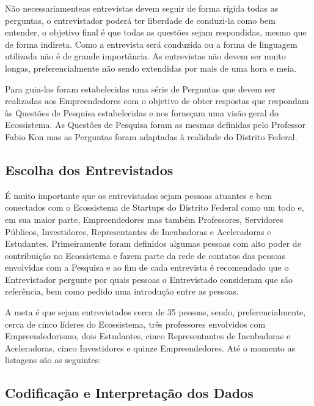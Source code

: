 Não necessariamenteas entrevistas devem seguir de forma rígida todas as perguntas, o entrevistador poderá ter liberdade de conduzi-la como bem entender, o objetivo final é que todas as questões sejam respondidas, mesmo que de forma indireta. Como a entrevista será conduzida ou a forma de linguagem utilizada não é de grande importância. As entrevistas não devem ser muito longas, preferencialmente não sendo extendidas por mais de uma hora e meia.

Para guia-las foram estabelecidas uma série de Perguntas que devem ser realizadas aos Empreendedores com o objetivo de obter respostas que respondam às Questões de Pesquisa estabelecidas e nos forneçam uma visão geral do Ecossistema. As Questões de Pesquisa foram as mesmas definidas pelo Professor Fabio Kon mas as Perguntas foram adaptadas à realidade do Distrito Federal.

\subsection{Escolha dos Entrevistados}
\label{subsection:escolha_dos_entrevistados}

É muito importante que os entrevistados sejam pessoas atuantes e bem conectados com o Ecossistema de Startups do Distrito Federal como um todo e, em sua maior parte, Empreendedores mas também
Professores, Servidores Públicos, Investidores, Representantes de Incubadoras e Aceleradoras e Estudantes. Primeiramente foram definidos algumas pessoas com alto poder de contribuição no Ecossistema
e fazem parte da rede de contatos das pessoas envolvidas com a Pesquisa e ao fim de cada entrevista é recomendado que o Entrevistador pergunte por quais pessoas o Entrevistado consideram que são
referência, bem como pedido uma introdução entre as pessoas.

A meta é que sejam entrevistados cerca de 35 pessoas, sendo, preferencialmente, cerca de cinco líderes do Ecossistema, três professores envolvidos com Empreendedorismo,
dois Estudantes, cinco Representantes de Incubadoras e Aceleradoras, cinco Investidores e quinze Empreendedores. Até o momento as listagens são as seguintes:

\subsection{Codificação e Interpretação dos Dados}
\label{subsection:codificacao_e_interpretacao_dos_dados}


